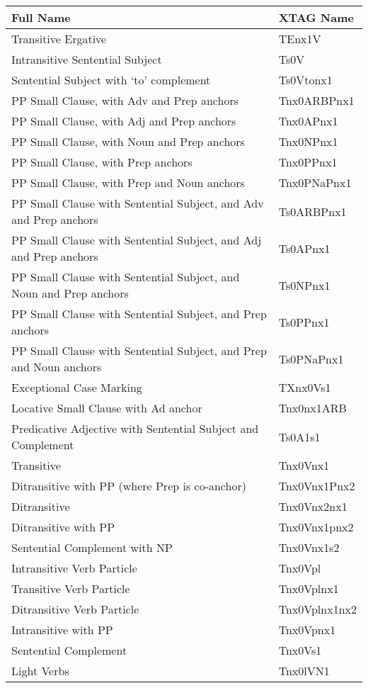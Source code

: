 \footnotesize
\begin{tabular}{ll}
Full Name&XTAG Name\\
\hline
Transitive Ergative  &  TEnx1V\\
Intransitive Sentential Subject &  Ts0V\\
Sentential Subject with `to' complement &  Ts0Vtonx1\\
PP Small Clause, with Adv and Prep anchors & Tnx0ARBPnx1\\
PP Small Clause, with Adj and Prep anchors & Tnx0APnx1\\
PP Small Clause, with Noun and Prep anchors & Tnx0NPnx1\\
PP Small Clause, with Prep anchors & Tnx0PPnx1\\
PP Small Clause, with Prep and Noun anchors & Tnx0PNaPnx1\\
PP Small Clause with Sentential Subject, and Adv and Prep anchors & Ts0ARBPnx1\\
PP Small Clause with Sentential Subject, and Adj and Prep anchors & Ts0APnx1\\
PP Small Clause with Sentential Subject, and Noun and Prep anchors & Ts0NPnx1\\
PP Small Clause with Sentential Subject, and Prep anchors & Ts0PPnx1\\
PP Small Clause with Sentential Subject, and Prep and Noun anchors & Ts0PNaPnx1\\
Exceptional Case Marking & TXnx0Vs1\\
Locative Small Clause with Ad anchor & Tnx0nx1ARB\\
Predicative Adjective with Sentential Subject and Complement & Ts0A1s1\\
Transitive & Tnx0Vnx1\\
Ditransitive with PP (where Prep is co-anchor) & Tnx0Vnx1Pnx2\\
Ditransitive & Tnx0Vnx2nx1\\
Ditransitive with PP & Tnx0Vnx1pnx2\\
Sentential Complement with NP & Tnx0Vnx1s2\\
Intransitive Verb Particle & Tnx0Vpl\\
Transitive Verb Particle & Tnx0Vplnx1\\
Ditransitive Verb Particle & Tnx0Vplnx1nx2\\
Intransitive with PP & Tnx0Vpnx1\\
Sentential Complement & Tnx0Vs1\\
Light Verbs & Tnx0lVN1\\

\end{tabular}
